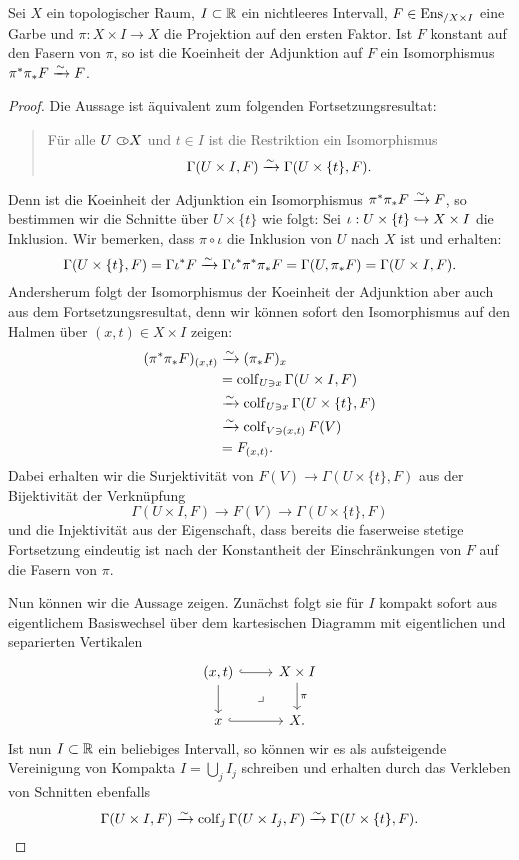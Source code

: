 \begin{lemma}[\cite{TG}, 6.4.17] \label{constant-on-fibers}
  Sei $X$ ein topologischer Raum, $I \subset \mathbb{R}$ ein nichtleeres
  Intervall, $F \in \operatorname{Ens}_{/X \times I}$ eine Garbe und $\pi: X \times
  I \to X$ die Projektion auf den ersten Faktor. Ist $F$ konstant auf
  den Fasern von $\pi$, so ist die Koeinheit der Adjunktion auf $F$
  ein Isomorphismus $\pi^* \pi_* F \xrightarrow[]{\sim} F$.
\end{lemma}
\begin{proof}
  Die Aussage ist äquivalent zum folgenden Fortsetzungsresultat:
  \begin{quote}
    Für alle $U \subset\kern-0.58em\circ X$ und $t \in I$ ist die Restriktion ein
    Isomorphismus
    \[ \Gamma(U \times I, F) \xrightarrow[]{\sim} \Gamma(U \times \{t\}, F). \]
  \end{quote}
  Denn ist die Koeinheit der Adjunktion ein Isomorphismus $\pi^* \pi_*
  F \xrightarrow[]{\sim} F$, so bestimmen wir die Schnitte über $U \times \{t\}$ wie
  folgt: Sei $\iota: U \times \{t\} \hookrightarrow X \times I$ die Inklusion. Wir
  bemerken, dass $\pi \circ \iota$ die Inklusion von $U$ nach $X$ ist
  und erhalten:
  \[ \Gamma(U \times \{t\}, F)
      = \Gamma \iota^* F
      \xrightarrow[]{\sim} \Gamma \iota^* \pi^* \pi_* F
      = \Gamma(U, \pi_* F)
      = \Gamma(U \times I, F). \]
  Andersherum folgt der Isomorphismus der Koeinheit der Adjunktion
  aber auch aus dem Fortsetzungsresultat, denn wir können sofort den
  Isomorphismus auf den Halmen über $(x, t) \in X \times I$ zeigen:
  \begin{align*}
    (\pi^* \pi_* F)_{(x,t)}
    &\xrightarrow[]{\sim} (\pi_* F)_x \\
    &= \operatorname{colf}\limits_{U \ni x} \Gamma(U \times I, F) \\
    &\xrightarrow[]{\sim} \operatorname{colf}\limits_{U \ni x} \Gamma(U \times \{t\}, F) \\
    &\xrightarrow[]{\sim} \operatorname{colf}\limits_{V \ni (x, t)} F(V) \\
    &= F_{(x, t)}.
  \end{align*}
  Dabei erhalten wir die Surjektivität von $F(V) \to \Gamma(U \times
  \{t\}, F)$ aus der Bijektivität der Verknüpfung
  \[ \Gamma(U \times I, F) \to F(V) \to \Gamma(U \times \{t\}, F) \]
  und die Injektivität aus der Eigenschaft, dass bereits die faserweise
  stetige Fortsetzung eindeutig ist nach der Konstantheit der
  Einschränkungen von $F$ auf die Fasern von $\pi$.

  Nun können wir die Aussage zeigen. Zunächst folgt sie für $I$
  kompakt sofort aus eigentlichem Basiswechsel über dem kartesischen
  Diagramm mit eigentlichen und separierten Vertikalen
  \[ \begin{tikzcd}
    (x, t) \rar[hook] \dar \arrow[dr, phantom, "\lrcorner"]
    & X \times I \dar["\pi"] \\
    x \rar[hook]
    & X.
  \end{tikzcd} \]
  Ist nun $I \subset \mathbb{R}$ ein beliebiges Intervall, so können wir es
  als aufsteigende Vereinigung von Kompakta $I = \bigcup_j I_j$
  schreiben und erhalten durch das Verkleben von Schnitten ebenfalls
  \[ \Gamma(U \times I, F)
  \xrightarrow[]{\sim} \operatorname{colf}_j \Gamma(U \times I_j, F)
  \xrightarrow[]{\sim} \Gamma(U \times \{t\}, F).
  \]
\end{proof}

